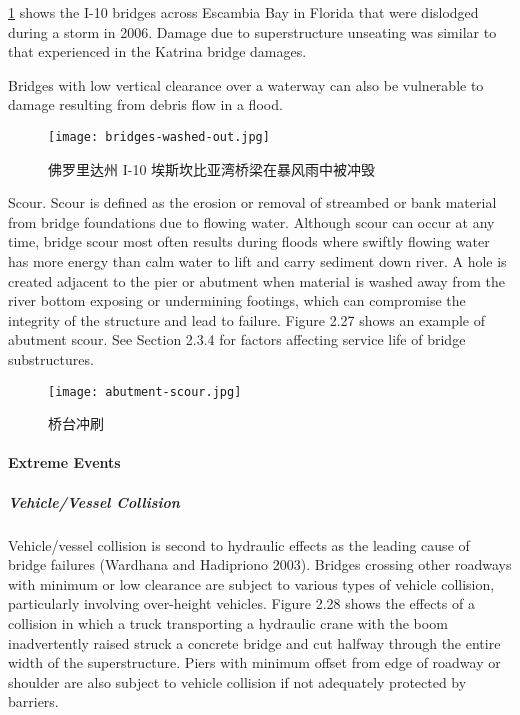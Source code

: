 \cref{fig:bridges-washed-out} shows the I-10 bridges across Escambia Bay in Florida that were dislodged during a storm in 2006.
Damage due to superstructure unseating was similar to that experienced in the Katrina bridge damages.

Bridges with low vertical clearance over a waterway can also be vulnerable to damage resulting from debris flow
in a flood.

\begin{figure}
  \texttt{[image: bridges-washed-out.jpg]}
  \caption{佛罗里达州 I-10 埃斯坎比亚湾桥梁在暴风雨中被冲毁}
  \label{fig:bridges-washed-out}
\end{figure}

Scour. Scour is defined as the erosion or removal of streambed or bank material from bridge foundations due to
flowing water. Although scour can occur at any time, bridge scour most often results during floods where swiftly
flowing water has more energy than calm water to lift and carry sediment down river. A hole is created adjacent to
the pier or abutment when material is washed away from the river bottom exposing or undermining footings, which can compromise the integrity of the structure and lead to failure. Figure 2.27 shows an example of abutment scour.
See Section 2.3.4 for factors affecting service life of bridge substructures.

\begin{figure}
  \texttt{[image: abutment-scour.jpg]}
  \caption{桥台冲刷}
  \label{fig:abutment-scour}
\end{figure}

\paragraph{Extreme Events}
\subparagraph{Vehicle/Vessel Collision}
Vehicle/vessel collision is second to hydraulic effects as the leading cause of bridge failures (Wardhana and
Hadipriono 2003). Bridges crossing other roadways with minimum or low clearance are subject to various types of
vehicle collision, particularly involving over-height vehicles. Figure 2.28 shows the effects of a collision in which a
truck transporting a hydraulic crane with the boom inadvertently raised struck a concrete bridge and cut halfway
through the entire width of the superstructure. Piers with minimum offset from edge of roadway or shoulder are also
subject to vehicle collision if not adequately protected by barriers.

